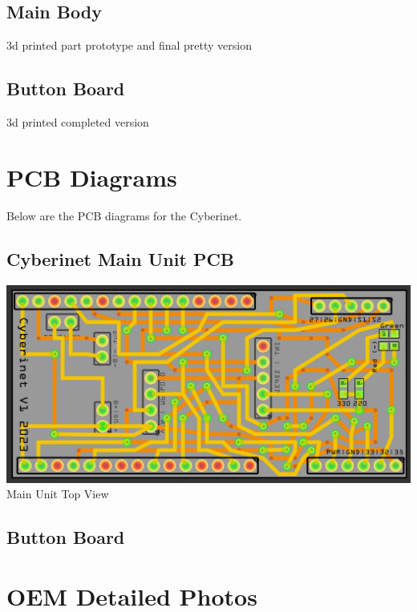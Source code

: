 \subsection{Main Body}
\vspace{5mm}
 3d printed part prototype and final pretty version

\subsection{Button Board}
\vspace{5mm}
3d printed completed version


\section{PCB Diagrams}
Below are the PCB diagrams for the Cyberinet.

\subsection{Cyberinet Main Unit PCB}
\vspace{5mm}

\begin{center}
    \includegraphics[scale=0.25]{diagrams/PCBs/mainBoard.png}\\
    \caption{Main Unit Top View}
\end{center}

\subsection{Button Board}
\vspace{5mm}

\section{OEM Detailed Photos}

